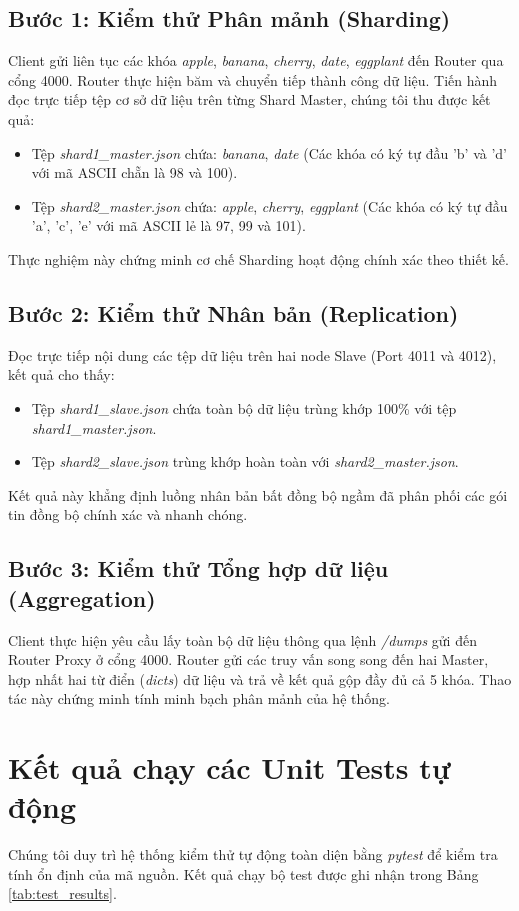 \documentclass[12pt,a4paper]{report}
\begin{document}
\subsection{Bước 1: Kiểm thử Phân mảnh (Sharding)}
Client gửi liên tục các khóa \textit{apple}, \textit{banana}, \textit{cherry}, \textit{date}, \textit{eggplant} đến Router qua cổng 4000.
Router thực hiện băm và chuyển tiếp thành công dữ liệu. Tiến hành đọc trực tiếp tệp cơ sở dữ liệu trên từng Shard Master, chúng tôi thu được kết quả:
\begin{itemize}
    \item Tệp \textit{shard1\_master.json} chứa: \textit{banana}, \textit{date} (Các khóa có ký tự đầu 'b' và 'd' với mã ASCII chẵn là 98 và 100).
    \item Tệp \textit{shard2\_master.json} chứa: \textit{apple}, \textit{cherry}, \textit{eggplant} (Các khóa có ký tự đầu 'a', 'c', 'e' với mã ASCII lẻ là 97, 99 và 101).
\end{itemize}
Thực nghiệm này chứng minh cơ chế Sharding hoạt động chính xác theo thiết kế.

\subsection{Bước 2: Kiểm thử Nhân bản (Replication)}
Đọc trực tiếp nội dung các tệp dữ liệu trên hai node Slave (Port 4011 và 4012), kết quả cho thấy:
\begin{itemize}
    \item Tệp \textit{shard1\_slave.json} chứa toàn bộ dữ liệu trùng khớp 100\% với tệp \textit{shard1\_master.json}.
    \item Tệp \textit{shard2\_slave.json} trùng khớp hoàn toàn với \textit{shard2\_master.json}.
\end{itemize}
Kết quả này khẳng định luồng nhân bản bất đồng bộ ngầm đã phân phối các gói tin đồng bộ chính xác và nhanh chóng.

\subsection{Bước 3: Kiểm thử Tổng hợp dữ liệu (Aggregation)}
Client thực hiện yêu cầu lấy toàn bộ dữ liệu thông qua lệnh \textit{/dumps} gửi đến Router Proxy ở cổng 4000. Router gửi các truy vấn song song đến hai Master, hợp nhất hai từ điển (\textit{dicts}) dữ liệu và trả về kết quả gộp đầy đủ cả 5 khóa. Thao tác này chứng minh tính minh bạch phân mảnh của hệ thống.

\section{Kết quả chạy các Unit Tests tự động}
Chúng tôi duy trì hệ thống kiểm thử tự động toàn diện bằng \textit{pytest} để kiểm tra tính ổn định của mã nguồn. Kết quả chạy bộ test được ghi nhận trong Bảng \ref{tab:test_results}.
\end{document}
